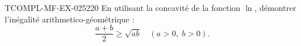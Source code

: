 \begin{exercice}{TCOMPL-MF-EX-025}{2}{20}
En utilisant la concavité de la fonction $\ln$, démontrer l'inégalité arithmetico-géométrique :
\[ \frac{a+b}{2} \geq \sqrt{ab} \quad (a > 0,\; b > 0). \]

\end{exercice}
